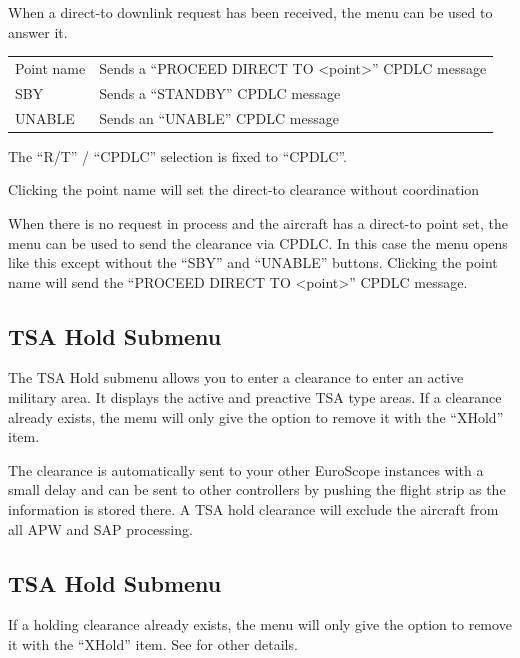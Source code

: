 \documentclass[11pt,a4paper]{memoir}
\newenvironment{Warn}
  {\begin{shaded}\marginnote{\fbox{Warning}}}
  {\end{shaded}}
\begin{document}
When a direct-to downlink request has been received, the menu can be used to answer it.

\begin{tabular}{l l}
Point name  & Sends a “PROCEED DIRECT TO <point>” CPDLC message
\\SBY         & Sends a “STANDBY” CPDLC message
\\UNABLE      & Sends an “UNABLE” CPDLC message
\end{tabular}   

The “R/T” / “CPDLC” selection is fixed to “CPDLC”.

\begin{Warn}
Clicking the point name will set the direct-to clearance without coordination
\end{Warn}

When there is no request in process and the aircraft has a direct-to point set, the menu can be used to send the clearance via CPDLC. In this case the menu opens like this except without the “SBY” and “UNABLE” buttons. Clicking the point name will send the “PROCEED DIRECT TO <point>” CPDLC message.

\subsection*{TSA Hold Submenu}
The TSA Hold submenu allows you to enter a clearance to enter an active military area. It displays the active and preactive TSA type areas. If a clearance already exists, the menu will only give the option to remove it with the “XHold” item.

The clearance is automatically sent to your other EuroScope instances with a small delay and can be sent to other controllers by pushing the flight strip as the information is stored there. A TSA hold clearance will exclude the aircraft from all APW and SAP processing.

\subsection*{TSA Hold Submenu}
If a holding clearance already exists, the menu will only give the option to remove it with the “XHold” item.
See \textit{} for other details.
\end{document}
